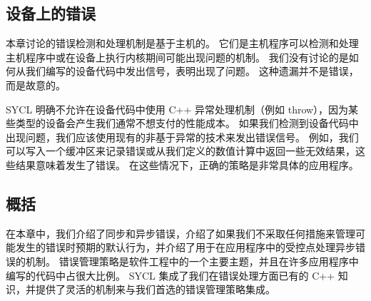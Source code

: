 \subsection{设备上的错误}
本章讨论的错误检测和处理机制是基于主机的。 它们是主机程序可以检测和处理主机程序中或在设备上执行内核期间可能出现问题的机制。 我们没有讨论的是如何从我们编写的设备代码中发出信号，表明出现了问题。 这种遗漏并不是错误，而是故意的。

SYCL 明确不允许在设备代码中使用 C++ 异常处理机制（例如 throw），因为某些类型的设备会产生我们通常不想支付的性能成本。 如果我们检测到设备代码中出现问题，我们应该使用现有的非基于异常的技术来发出错误信号。 例如，我们可以写入一个缓冲区来记录错误或从我们定义的数值计算中返回一些无效结果，这些结果意味着发生了错误。 在这些情况下，正确的策略是非常具体的应用程序。

\subsection{概括}
在本章中，我们介绍了同步和异步错误，介绍了如果我们不采取任何措施来管理可能发生的错误时预期的默认行为，并介绍了用于在应用程序中的受控点处理异步错误的机制。 错误管理策略是软件工程中的一个主要主题，并且在许多应用程序中编写的代码中占很大比例。 SYCL 集成了我们在错误处理方面已有的 C++ 知识，并提供了灵活的机制来与我们首选的错误管理策略集成。

